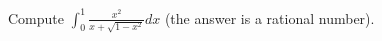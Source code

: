 Compute $\displaystyle \int_0^1 \frac{x^2}{x + \sqrt{1 - x^2}} dx$ (the answer
is a rational number).
